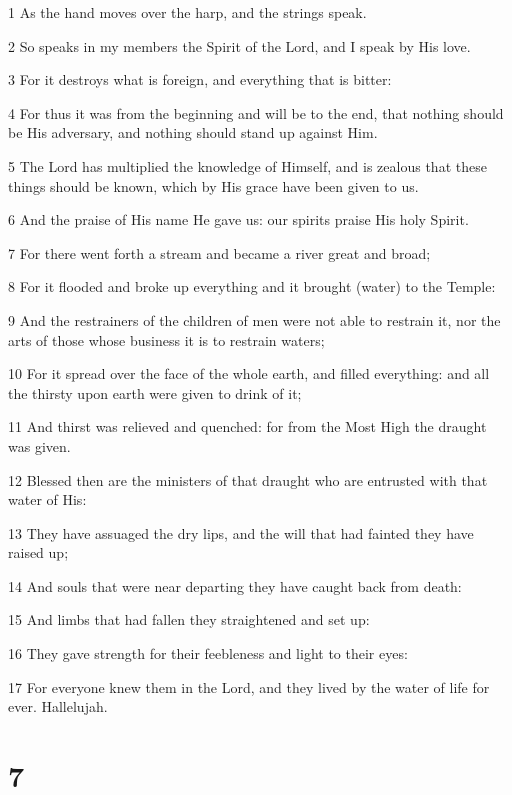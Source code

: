 \par 1 As the hand moves over the harp, and the strings speak.
\par 2 So speaks in my members the Spirit of the Lord, and I speak by His love.
\par 3 For it destroys what is foreign, and everything that is bitter:
\par 4 For thus it was from the beginning and will be to the end, that nothing should be His adversary, and nothing should stand up against Him.
\par 5 The Lord has multiplied the knowledge of Himself, and is zealous that these things should be known, which by His grace have been given to us.
\par 6 And the praise of His name He gave us: our spirits praise His holy Spirit.
\par 7 For there went forth a stream and became a river great and broad;
\par 8 For it flooded and broke up everything and it brought (water) to the Temple:
\par 9 And the restrainers of the children of men were not able to restrain it, nor the arts of those whose business it is to restrain waters;
\par 10 For it spread over the face of the whole earth, and filled everything: and all the thirsty upon earth were given to drink of it;
\par 11 And thirst was relieved and quenched: for from the Most High the draught was given.
\par 12 Blessed then are the ministers of that draught who are entrusted with that water of His:
\par 13 They have assuaged the dry lips, and the will that had fainted they have raised up;
\par 14 And souls that were near departing they have caught back from death:
\par 15 And limbs that had fallen they straightened and set up:
\par 16 They gave strength for their feebleness and light to their eyes:
\par 17 For everyone knew them in the Lord, and they lived by the water of life for ever. Hallelujah.



\chapter{7}

